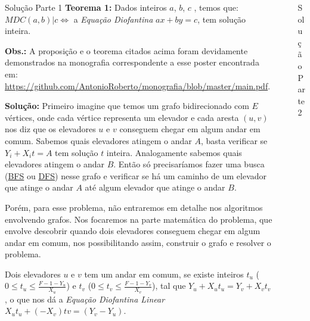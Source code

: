 \documentclass[final,hyperref={pdfpagelabels=false}]{beamer}
\begin{document}
\begin{frame}[t]
\begin{columns}[t]
\begin{column}{.465\textwidth}
\begin{block}{Solução Parte 1}
\textbf{Teorema 1: }
Dados inteiros $a$, $b$, $c$ , temos que:
$MDC(a,b)|c \Leftrightarrow$ a \textit{Equação Diofantina} $ax + by=c$, tem solução inteira.

\textbf{Obs.:} A proposição e o teorema citados acima foram devidamente demonstrados na monografia correspondente a esse poster encontrada em: \href{https://github.com/AntonioRoberto/monografia/blob/master/main.pdf}{https://github.com/AntonioRoberto/monografia/blob/master/main.pdf}.
\newline

\textbf{Solução: }Primeiro imagine que temos um grafo bidirecionado com $E$ vértices, onde cada vértice representa um elevador e cada aresta $(u,v)$ nos diz que os elevadores $u$ e $v$
conseguem chegar em algum andar em comum.
Sabemos quais elevadores atingem o andar $A$, basta verificar se $Y_i+X_it=A$ tem solução $t$ inteira. Analogamente sabemos quais elevadores atingem o andar
$B$. Então só precisaríamos fazer uma busca (\href{https://en.wikipedia.org/wiki/Breadth-first_search}{BFS} ou \href{https://en.wikipedia.org/wiki/Depth-first_search}{DFS})
nesse grafo e verificar se há um caminho de um elevador que atinge o andar $A$ até algum elevador que atinge o andar $B$.

Porém, para esse problema, não entraremos em detalhe nos algoritmos envolvendo grafos. Nos focaremos na parte matemática do problema, que envolve descobrir quando dois elevadores conseguem chegar em algum andar em comum, nos possibilitando assim, construir o grafo e resolver o problema.

Dois elevadores $u$ e $v$ tem um andar em comum, se existe inteiros $t_u$ ($0\leq t_u\leq \frac{F-1-Y_u}{X_u}$) e $t_v$ ($0\leq t_v\leq \frac{F-1-Y_v}{X_v}$), tal que
$Y_u+X_ut_u = Y_v+X_vt_v$, o que nos dá a \textit{Equação Diofantina Linear} $X_ut_u + (-X_v)tv = (Y_v-Y_u)$.



\end{block}

\end{column} %

\begin{column}{.03\textwidth}\end{column} %
 
\begin{column}{.465\textwidth} %
\begin{block}{Solução Parte 2}



\end{block}
\end{column}
\end{columns}
\end{frame}
\end{document}
